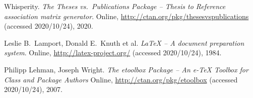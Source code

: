 \documentclass{article}
\begin{document}
\begin{thebibliography}{3}
Whisperity. \textit{The \textsf{Theses vs.\ Publications} Package -- Thesis to Reference association matrix generator}.
Online, \url{http://ctan.org/pkg/thesesvspublications} (accessed 2020/10/24), 2020.

Leslie B.\ Lamport, Donald E.\ Knuth et al. 
\textit{\LaTeX{} -- A document preparation system}. 
Online, \url{http://latex-project.org/} (accessed 2020/10/24), 1984.

Philipp Lehman, Joseph Wright.
\textit{The \textsf{etoolbox} Package -- An e-\TeX{} Toolbox for Class and Package Authors}
Online, \url{http://ctan.org/pkg/etoolbox} (accessed 2020/10/24), 2007.
\end{thebibliography}
\end{document}
